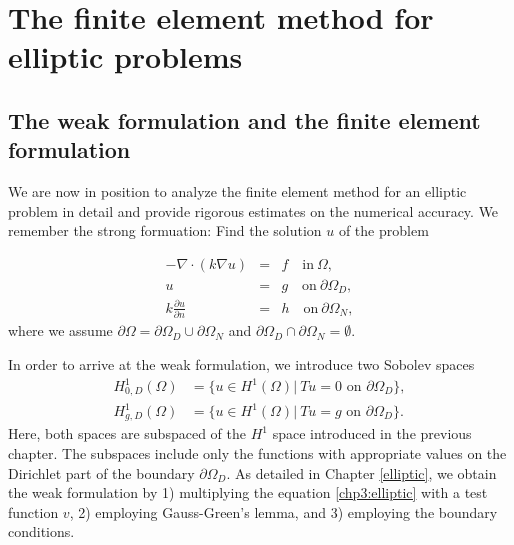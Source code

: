 \chapter{The finite element method for elliptic problems}
\label{ch:elliptic2}

\section{The weak formulation and the finite element formulation}

We are now in position to analyze the finite element method
for an elliptic problem in detail and provide rigorous estimates
on the numerical accuracy. We remember the strong formuation:  
Find the solution $u$ of the problem

\begin{eqnarray}
\label{chp3:elliptic}
-\nabla\cdot(k\nabla u)  &=& f \quad \textrm{in}\ \Omega,\\
\label{chp3:Dirichlet}
u&=& g \quad \textrm{on}\ \partial\Omega_D, \\
\label{chp3:Neumann}
k \frac{\partial u}{\partial n}&=& h \quad \textrm{on}\ \partial\Omega_N , 
\end{eqnarray}
where we assume $\partial \Omega = \partial \Omega_D \cup \partial \Omega_N$ 
and $\partial \Omega_D \cap \partial \Omega_N = \emptyset$.

In order to arrive at the weak formulation, we introduce two Sobolev spaces
\begin{align}
H^1_{0, D} (\Omega) &= \{ u \in H^1(\Omega)  | \  T u = 0 \mbox{ on } \partial \Omega_D \}, \\   
H^1_{g, D} (\Omega) &= \{ u \in H^1(\Omega)  | \  T u = g \mbox{ on } \partial \Omega_D \}  .  
\end{align}
Here, both spaces are subspaced of the $H^1$ space introduced in the previous chapter. The 
subspaces include only the functions with appropriate values on the Dirichlet part of the boundary $\partial \Omega_D$.  
As detailed in Chapter \ref{elliptic}, we obtain the weak formulation by 1) multiplying
the equation \eqref{chp3:elliptic} with a test function $v$, 2) employing Gauss-Green's lemma, and 3) employing the 
boundary conditions. 

